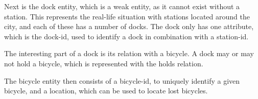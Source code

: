 Next is the dock entity, which is a weak entity, as it cannot exist without a station.
This represents the real-life situation with stations located around the city, and each of these has a number of docks.
The dock only has one attribute, which is the dock-id, used to identify a dock in combination with a station-id.

The interesting part of a dock is its relation with a bicycle.
A dock may or may not hold a bicycle, which is represented with the holds relation.

The bicycle entity then consists of a bicycle-id, to uniquely identify a given bicycle, and a location, which can be used to locate lost bicycles.
